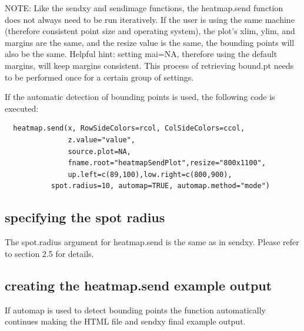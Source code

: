 \documentclass[]{article}
\begin{document}
NOTE: Like the sendxy and sendimage functions, the heatmap.send function does not always need to be run iteratively. If the user is using the same machine (therefore consistent point size and operating system), the plot's xlim, ylim, and margins are the same, and the resize value is the same, the bounding points will also be the same. Helpful hint: setting mai=NA, therefore using the default margins, will keep margins consistent. This process of retrieving bound.pt needs to be performed once for a certain group of settings.\newline

\indent If the automatic detection of bounding points is used, the following code is executed:
\begin{verbatim}
  heatmap.send(x, RowSideColors=rcol, ColSideColors=ccol,
               z.value="value",
               source.plot=NA,
               fname.root="heatmapSendPlot",resize="800x1100",
               up.left=c(89,100),low.right=c(800,900),
	       spot.radius=10, automap=TRUE, automap.method="mode")
\end{verbatim}



\subsection{specifying the spot radius}

\indent The spot.radius argument for heatmap.send is the same as in sendxy. Please refer to section 2.5 for details. 

\subsection{creating the heatmap.send example output}

\indent If automap is used to detect bounding points the function automatically continues making the HTML file and sendxy final example output. 
\end{document}
